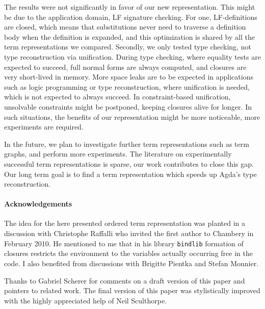 \documentclass[submission,copyright,creativecommons]{eptcs}
\begin{document}
The results were not significantly in favor of our new representation.
This might be due to the application domain, LF signature checking.
For one, LF-definitions are closed, which means that substitutions
never need to traverse a definition body when the definition is
expanded, and this optimization is shared by all the term
representations we compared.  Secondly, we only tested type checking,
not type reconstruction via unification.  During type checking, where
equality tests are expected to succeed, full normal forms are always
computed, and closures are very short-lived in memory.  More space
leaks are to be expected in applications such as logic programming or
type reconstruction, where unification is needed, which is not
expected to always succeed.   In constraint-based unification,
unsolvable constraints might be postponed, keeping closures alive for
longer.  In such situations, the benefits of our representation might
be more noticeable, more experiments are required.

In the future, we plan to investigate further term representations
such as term graphs, and perform more experiments.  The literature on
experimentally successful term representations is sparse, our work
contributes to close this gap.  Our long term goal is to find a
term representation which speeds up Agda's type reconstruction.


\paragraph*{Acknowledgements}
The idea for the here presented ordered term representation was
planted in a discussion with Christophe Raffalli who invited the first
author to Chambery in February 2010.  He mentioned to me that in his
library \texttt{bindlib} formation of closures restricts the
environment to the variables actually occurring free in the code.  I
also benefited from discussions with Brigitte Pientka and Stefan Monnier.

Thanks to Gabriel Scherer for comments on a draft version of this
paper and pointers to related work. 
The final version of this paper was stylistically improved with the highly appreciated help of Neil Sculthorpe.





\end{document}

